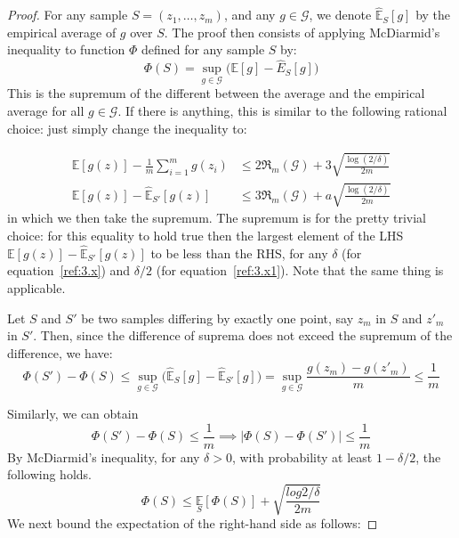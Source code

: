 \begin{proof}
For any sample $S=(z_1,\dots,z_m)$, and any $g\in\mathcal{G}$, we denote $\hat{\mathbb{E}}_{S}[g]$ by the empirical average of $g$ over $S$. The proof then consists of applying McDiarmid's inequality to function $\Phi$ defined for any sample $S$ by: 
\begin{equation}
    \Phi(S) = \sup_{g\in\mathcal{G}} \Big(\mathbb{E}[g]- \hat{E}_{S}[g]\Big)
\end{equation}
This is the supremum of the different between the average and the empirical average for all $g\in \mathcal{G}$. If there is anything, this is similar to the following rational choice: just simply change the inequality to: 

\begin{equation}
    \begin{aligned}
        \mathbb{E}[g(z)] - \frac{1}{m} \sum^{m}_{i=1} g(z_{i}) &\leq  2\mathfrak{R}_{m}(\mathcal{G}) + 3\sqrt{\frac{\log(2/\delta)}{2m}}\\
        \mathbb{E}[g(z)] - \hat{\mathbb{E}}_{S'}[g(z)] &\leq  3\mathfrak{R}_{m}(\mathcal{G}) + a\sqrt{\frac{\log(2/\delta)}{2m}}
    \end{aligned}
\end{equation}
in which we then take the supremum. The supremum is for the pretty trivial choice: for this equality to hold true then the largest element of the LHS $\mathbb{E}[g(z)] - \hat{\mathbb{E}}_{S'}[g(z)]$ to be less than the RHS, for any $\delta$ (for equation~\ref{ref:3.x}) and $\delta/2$ (for equation~\ref{ref:3.x1}). Note that the same thing is applicable. 

Let $S$ and $S'$ be two samples differing by exactly one point, say $z_{m}$ in $S$ and $z'_{m}$ in $S'$. Then, since the difference of suprema does not exceed the supremum of the difference, we have: 
\begin{equation}
    \Phi(S')- \Phi(S) \leq \sup_{g\in \mathcal{G}} \Big ( \hat{\mathbb{E}}_{S}[g] - \hat{\mathbb{E}}_{S'}[g] \Big) = \sup_{g\in \mathcal{G}} \frac{g(z_m) - g(z'_m)}{m} \leq \frac{1}{m}
\end{equation}

Similarly, we can obtain 
\begin{equation}
    \Phi(S') - \Phi(S) \leq \frac{1}{m} \implies \left|\Phi(S) - \Phi(S')\right|\leq \frac{1}{m}
\end{equation}
By McDiarmid's inequality, for any $\delta > 0$, with probability at least $1-\delta /2$, the following holds. 
\begin{equation}
    \Phi(S) \leq \underset{S}{\mathbb{E}} [\Phi(S)] + \sqrt{\frac{log{2/\delta}}{2m}}
\end{equation}
We next bound the expectation of the right-hand side as follows: 


\end{proof}
